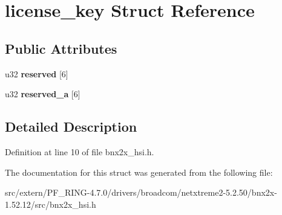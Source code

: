 \hypertarget{structlicense__key}{
\section{license\_\-key Struct Reference}
\label{structlicense__key}
}
\subsection*{Public Attributes}
\begin{DoxyCompactItemize}
\item 
\hypertarget{structlicense__key_a4370d1a428c4f33b16ea6a28f19e8b6b}{
u32 {\bfseries reserved} \mbox{[}6\mbox{]}}
\label{structlicense__key_a4370d1a428c4f33b16ea6a28f19e8b6b}

\item 
\hypertarget{structlicense__key_a65db13fab2cb695092034aa76e1a8deb}{
u32 {\bfseries reserved\_\-a} \mbox{[}6\mbox{]}}
\label{structlicense__key_a65db13fab2cb695092034aa76e1a8deb}

\end{DoxyCompactItemize}


\subsection{Detailed Description}


Definition at line 10 of file bnx2x\_\-hsi.h.



The documentation for this struct was generated from the following file:\begin{DoxyCompactItemize}
\item 
src/extern/PF\_\-RING-\/4.7.0/drivers/broadcom/netxtreme2-\/5.2.50/bnx2x-\/1.52.12/src/bnx2x\_\-hsi.h\end{DoxyCompactItemize}
